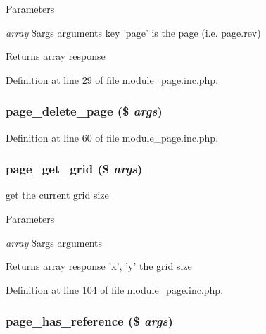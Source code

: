 \begin{DoxyParams}{Parameters}
\item[{\em array}]\$args arguments key 'page' is the page (i.e. page.rev) \end{DoxyParams}
\begin{DoxyReturn}{Returns}
array response 
\end{DoxyReturn}


Definition at line 29 of file module\_\-page.inc.php.

\hypertarget{module__page_8inc_8php_aedf11987fbd07763073255783077951b}{
\subsubsection[{page\_\-delete\_\-page}]{\setlength{\rightskip}{0pt plus 5cm}page\_\-delete\_\-page (\$ {\em args})}}
\label{module__page_8inc_8php_aedf11987fbd07763073255783077951b}


Definition at line 60 of file module\_\-page.inc.php.

\hypertarget{module__page_8inc_8php_aac90d98ff7e17055e3dc3d953371d673}{
\subsubsection[{page\_\-get\_\-grid}]{\setlength{\rightskip}{0pt plus 5cm}page\_\-get\_\-grid (\$ {\em args})}}
\label{module__page_8inc_8php_aac90d98ff7e17055e3dc3d953371d673}
get the current grid size


\begin{DoxyParams}{Parameters}
\item[{\em array}]\$args arguments \end{DoxyParams}
\begin{DoxyReturn}{Returns}
array response 'x', 'y' the grid size 
\end{DoxyReturn}


Definition at line 104 of file module\_\-page.inc.php.

\hypertarget{module__page_8inc_8php_a0184f1023facb8121f9a99348c978d55}{
\subsubsection[{page\_\-has\_\-reference}]{\setlength{\rightskip}{0pt plus 5cm}page\_\-has\_\-reference (\$ {\em args})}}
\label{module__page_8inc_8php_a0184f1023facb8121f9a99348c978d55}


